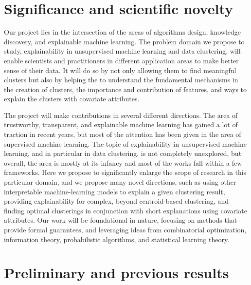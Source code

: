 \documentclass[a4paper,11pt]{article}
\begin{document}
\section{Significance and scientific novelty}


 Our project lies in the intersection of the areas of  
algorithms design, knowledge discovery, and explainable machine learning.
The problem domain we propose to study, 
explainability in unsupervised machine learning and data clustering, 
will enable scientists and practitioners in  different application areas to 
make better sense of their data. 
It will do so by not only allowing them to find meaningful clusters
but also by helping the to understand the fundamental mechanisms in the creation of clusters, 
the importance and contribution of features, and ways to explain the clusters
with covariate attributes.

The project will make contributions in several different directions. 
The area of trustworthy, transparent, and explainable machine learning 
has gained a lot of traction in recent years, but most of the attention
has been given in the area of supervised machine learning. 
The topic of explainability in unsupervised machine learning, 
and in particular in data clustering, 
is not completely unexplored, 
but overall, the area is mostly at its infancy and 
most of the works fall within a few frameworks. 
Here we propose to significantly enlarge the scope of research in this particular domain, 
and we propose many novel directions, 
such as using other interpretable machine-learning models to explain a given clustering result, 
providing explainability for complex, beyond centroid-based clustering, 
and finding optimal clusterings in conjunction with short explanations using covariate attributes. 
Our work will be foundational in nature, 
focusing on methods that provide formal guarantees, 
and leveraging ideas from combinatorial optimization, 
information theory, probabilistic algorithms, and statistical learning theory.

\section{Preliminary and previous results}
\end{document}
